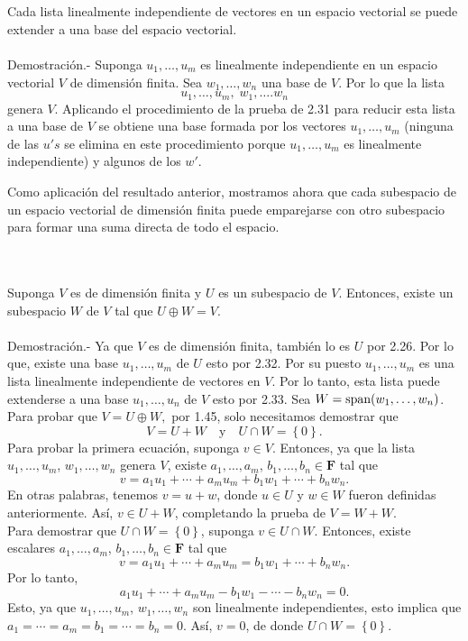 \setcounter{myteo}{32}
\begin{myteo}\,\\\\
    Cada lista linealmente independiente de vectores en un espacio vectorial se puede extender a una base del espacio vectorial.\\\\
	Demostración.-\; Suponga $u_1,\ldots,u_m$ es linealmente independiente en un espacio vectorial $V$ de dimensión finita. Sea $w_1,\ldots,w_n$ una base de $V$. Por lo que la lista
	$$u_1,\ldots,u_m,\; w_1,\ldots.w_n$$
	genera $V$. Aplicando el procedimiento de la prueba de 2.31 para reducir esta lista a una base de $V$ se obtiene una base formada por los vectores $u_1, \ldots , u_m$ (ninguna de las $u's$ se elimina en este procedimiento porque $u_1,\ldots, u_m$ es linealmente independiente) y algunos de los $w'$.
\end{myteo}

Como aplicación del resultado anterior, mostramos ahora que cada subespacio de un espacio vectorial de dimensión finita puede emparejarse con otro subespacio para formar una suma directa de todo el espacio.

\begin{myteo}\;\\\\
    Suponga $V$ es de dimensión finita y $U$ es un subespacio de $V$. Entonces, existe un subespacio $W$ de $V$ tal que $U\oplus W=V$.\\\\
	Demostración.-\; Ya que $V$ es de dimensión finita, también lo es $U$ por 2.26. Por lo que, existe una base $u_1,\ldots,u_m$ de $U$ esto por 2.32. Por su puesto $u_1,\ldots,u_m$ es una lista linealmente independiente de vectores en $V$. Por lo tanto, esta lista puede extenderse a una base $u_1,\ldots,u_n$ de $V$ esto por 2.33. Sea $W=\mathop{\mbox{\normalfont span}}\nolimits(w_1,\ldots,w_n)$. Para probar que $V=U\oplus W,$ por 1.45, solo necesitamos demostrar que
	$$V=U+W \quad \mbox{y}\quad U\cap W=\left\{0\right\}.$$
	Para probar la primera ecuación, suponga $v\in V$. Entonces, ya que la lista $u_1,\ldots,u_m$, $w_1,\ldots,w_n$ genera $V$, existe $a_1,\ldots,a_m$, $b_1,\ldots,b_n\in \textbf{F}$ tal que
	$$v=a_1u_1+\cdots+a_mu_m+b_1w_1+\cdots+b_nw_n.$$
	En otras palabras, tenemos $v=u+w$, donde $u\in U$ y $w\in W$ fueron definidas anteriormente. Así, $v\in U+W$, completando la prueba de $V=W+W$.\\
	Para demostrar que $U\cap W=\left\{0\right\}$, suponga $v\in U\cap W$. Entonces, existe escalares $a_1,\ldots,a_m$, $b_1,\ldots,b_n\in \textbf{F}$ tal que
	$$v=a_1u_1+\cdots+a_mu_m=b_1w_1+\cdots+b_nw_n.$$
	Por lo tanto,
	$$a_1u_1+\cdots+a_mu_m-b_1w_1-\cdots-b_nw_n=0.$$
	Esto, ya que $u_1,\ldots,u_m$, $w_1,\ldots,w_n$ son linealmente independientes, esto implica que $a_1=\cdots=a_m=b_1=\cdots=b_n=0$. Así, $v=0$, de donde $U\cap W= \left\{0\right\}$.
\end{myteo}

